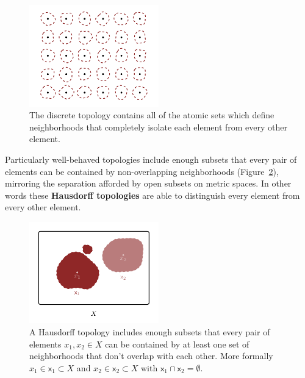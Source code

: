\documentclass[
  letterpaper,
  DIV=11,
  numbers=noendperiod]{scrartcl}
\begin{document}
\begin{figure}

{\centering \includegraphics[width=0.5\textwidth,height=\textheight]{figures/structures/general_topology/discrete_topology/discrete_topology.pdf}

}

\caption{\label{fig-general-discrete-neighborhoods}The discrete topology
contains all of the atomic sets which define neighborhoods that
completely isolate each element from every other element.}

\end{figure}

Particularly well-behaved topologies include enough subsets that every
pair of elements can be contained by non-overlapping neighborhoods
(Figure~\ref{fig-general-separation}), mirroring the separation afforded
by open subsets on metric spaces. In other words these \textbf{Hausdorff
topologies} are able to distinguish every element from every other
element.

\begin{figure}

{\centering \includegraphics[width=0.5\textwidth,height=\textheight]{figures/structures/general_topology/separation/separation.pdf}

}

\caption{\label{fig-general-separation}A Hausdorff topology includes
enough subsets that every pair of elements \(x_{1}, x_{2} \in X\) can be
contained by at least one set of neighborhoods that don't overlap with
each other. More formally \(x_{1} \in \mathsf{x}_{1} \subset X\) and
\(x_{2} \in \mathsf{x}_{2} \subset X\) with
\(\mathsf{x}_{1} \cap \mathsf{x}_{2} = \emptyset\).}

\end{figure}
\end{document}

